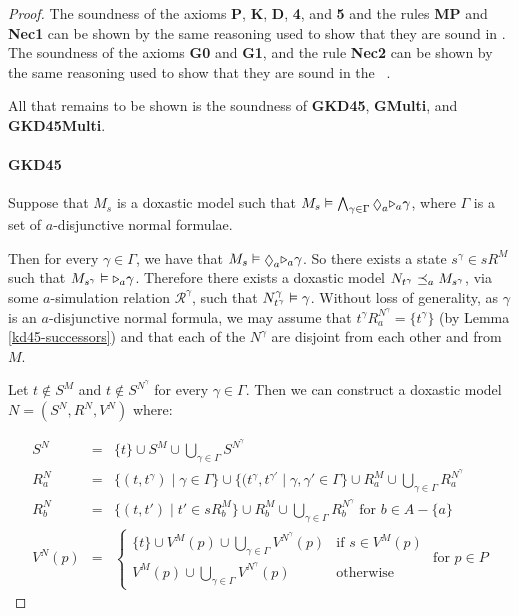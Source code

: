 \begin{proof}
The soundness of the axioms {\bf P}, {\bf K}, {\bf D}, {\bf 4}, and {\bf 5} and the
rules {\bf MP} and {\bf Nec1} can be shown by the same reasoning used to show
that they are sound in \logicKD{}. The soundness of the axioms {\bf G0} and {\bf
G1}, and the rule {\bf Nec2} can be shown by the same reasoning used to show
that they are sound in the \logicKiF{}~\cite{french2010future}.

All that remains to be shown is the soundness of {\bf GKD45}, {\bf GMulti}, and
{\bf GKD45Multi}.

\paragraph{GKD45}
Suppose that $M_s$ is a doxastic model such that $M_s \entails \bigwedge_{\gamma
\in \Gamma} \suspects_a \somerefs_a \gamma$, where $\Gamma$ is a set of
$a$-disjunctive normal formulae.

Then for every $\gamma \in \Gamma$, we have that $M_s \entails \suspects_a
\somerefs_a \gamma$. So there exists a state $s^\gamma \in sR^M$ such
that $M_{s^\gamma} \vDash {\ensuremath{\mathopen{\triangleright}}}_a \gamma$. Therefore there exists a
doxastic model $N_{t^\gamma} \preceq_a M_{s^\gamma}$, via some $a$-simulation
relation $\mathcal{R}^\gamma$, such that $N^\gamma_{t^\gamma} \vDash \gamma$.
Without loss of generality, as $\gamma$ is an $a$-disjunctive normal formula, we
may assume that $t^\gamma R^{N^\gamma}_a = \{t^\gamma\}$ (by Lemma
\ref{kd45-successors}) and that each of the $N^\gamma$ are disjoint from each
other and from $M$.

Let $t \notin S^M$ and $t \notin S^{N^\gamma}$ for every $\gamma \in \Gamma$.
Then we can construct a doxastic model $N = (S^N, R^N, V^N)$ where:

\begin{eqnarray*}
S^N &=& \{t\} \cup S^M \cup \bigcup_{\gamma \in \Gamma} S^{N^\gamma}\\
R^N_a &=& \{(t, t^\gamma) \mid \gamma \in \Gamma\} 
\cup \{(t^\gamma, t^{\gamma'} \mid \gamma, \gamma' \in \Gamma\} 
\cup R^M_a
\cup \bigcup_{\gamma \in \Gamma} R^{N^\gamma}_a\\
R^N_b &=& \{(t, t') \mid t' \in sR^M_b\}
\cup R^M_b
\cup \bigcup_{\gamma \in \Gamma} R^{N^\gamma}_b \text{ for $b \in A - \{a\}$}\\
V^N(p) &=& 
\begin{cases}
\{t\} \cup V^M(p) \cup \bigcup_{\gamma \in \Gamma} V^{N^\gamma}(p) & \text{if $s
\in V^M(p)$}\\
V^M(p) \cup \bigcup_{\gamma \in \Gamma} V^{N^\gamma}(p) & \text{otherwise}
\end{cases}
\text{ for $p \in P$}
\end{eqnarray*}


\end{proof}
